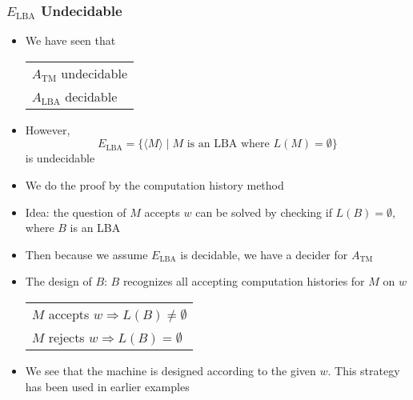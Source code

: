 





\begin{frame}[allowframebreaks]
\frametitle{$E_{\text{LBA}}$ Undecidable}
\begin{itemize}
\item We have seen that
  \begin{center}
    \begin{tabular}{l}
      $A_{\text{TM}}$ undecidable \\
      $A_{\text{LBA}}$ decidable 
    \end{tabular}
  \end{center}
\item However,
    \begin{equation*}
  E_{\text{LBA}}=
\{\langle  M\rangle\mid M \mbox{ is an LBA where } L(M) = \emptyset\}
\end{equation*}
is undecidable
\item We do the proof by the computation history method
\item Idea: the question of $M$ accepts $w$ can be solved by
  checking if $L(B) = \emptyset$, where $B$ is an LBA
\item Then because we assume $E_{\text{LBA}}$ is decidable, we have a decider
  for $A_{\text{TM}}$
\item The design of $B$: $B$ recognizes all accepting computation
  histories for $M$ on $w$
  \begin{center}
    \begin{tabular}{l}
      $M$ accepts $w \Rightarrow L(B) \neq \emptyset$\\
      $M$ rejects $w \Rightarrow L(B) = \emptyset$
    \end{tabular}
  \end{center}
\item We see that the machine is designed according to the given
  $w$. This strategy has been used in earlier examples
  

\end{itemize}
\end{frame}
